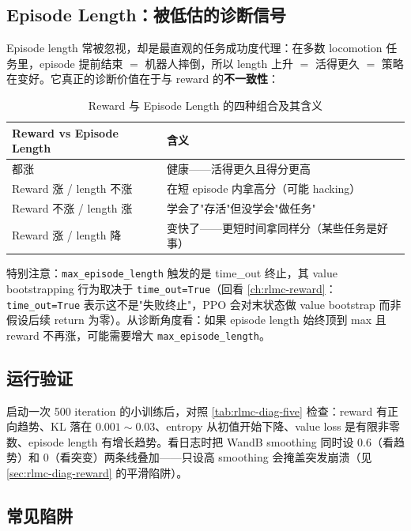 \subsection{Episode Length：被低估的诊断信号}

Episode length 常被忽视，却是最直观的任务成功度代理：在多数 locomotion 任务里，episode 提前结束 $=$ 机器人摔倒，所以 length 上升 $=$ 活得更久 $=$ 策略在变好。它真正的诊断价值在于与 reward 的\textbf{不一致性}：

\begin{table}[H]
\centering
\caption{Reward 与 Episode Length 的四种组合及其含义}
\label{tab:rlmc-diag-rewlen}
\begin{tabular}{p{4.2cm}p{8.0cm}}
\hline
Reward vs Episode Length & 含义 \\
\hline
都涨 & 健康——活得更久且得分更高 \\
Reward 涨 / length 不涨 & 在短 episode 内拿高分（可能 hacking） \\
Reward 不涨 / length 涨 & 学会了"存活"但没学会"做任务" \\
Reward 涨 / length 降 & 变快了——更短时间拿同样分（某些任务是好事） \\
\hline
\end{tabular}
\end{table}

特别注意：\verb|max_episode_length| 触发的是 time\_out 终止，其 value bootstrapping 行为取决于 \verb|time_out=True|（回看 \cref{ch:rlmc-reward}：\verb|time_out=True| 表示这不是"失败终止"，PPO 会对末状态做 value bootstrap 而非假设后续 return 为零）。从诊断角度看：如果 episode length 始终顶到 max 且 reward 不再涨，可能需要增大 \verb|max_episode_length|。

\subsection{运行验证}

启动一次 500 iteration 的小训练后，对照 \cref{tab:rlmc-diag-five} 检查：reward 有正向趋势、KL 落在 $0.001\sim0.03$、entropy 从初值开始下降、value loss 是有限非零数、episode length 有增长趋势。看日志时把 WandB smoothing 同时设 0.6（看趋势）和 0（看突变）两条线叠加——只设高 smoothing 会掩盖突发崩溃（见 \cref{sec:rlmc-diag-reward} 的平滑陷阱）。

\subsection{常见陷阱}

